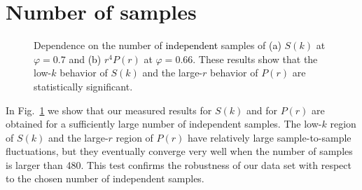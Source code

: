 \documentclass[aps,pre,twocolumn,superscriptaddress]{revtex4-1}
\renewcommand{\phi}{\varphi}
\newcommand{\red}[1]{\textcolor{black}{#1}}
\begin{document}
\section{Number of samples}
\label{app:finitesample}
 
\begin{figure}
\begin{center}
\caption{Dependence on the number of \red{independent} samples of 
\red{(a)} $S(k)$ at $\varphi=0.7$ and \red{(b)} $r^4 P(r)$ at $\phi =0.66$.
These results show that the low-$k$ behavior 
of $S(k)$ and the large-$r$ behavior of $P(r)$ 
are statistically significant.}
\label{fig:sample}
\end{center}
\end{figure}

In Fig.~\ref{fig:sample} we show that our measured results for 
$S(k)$ and for $P(r)$ are obtained for a sufficiently large 
number of independent samples. 
The low-$k$ region of $S(k)$ and the large-$r$ region of $P(r)$ 
have relatively large sample-to-sample fluctuations, but 
they eventually converge very well when the number of samples 
is larger than 480. 
This test confirms the robustness of our data set with respect to the 
chosen number of independent samples.

\newpage
\end{document}
